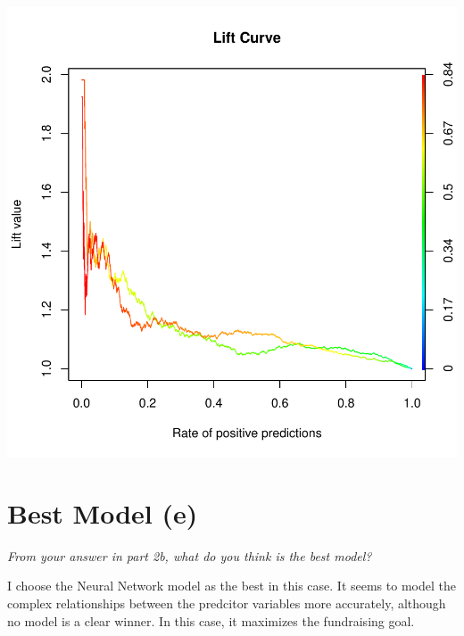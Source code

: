 \documentclass{article}
\begin{document}
\begin{Schunk}
\end{Schunk}
\includegraphics{DirectMailPrediction-026}

\section*{Best Model (e)}
{\it
From your answer in part 2b, what do you think is the best model?}

\noindent
\newline
I choose the Neural Network model as the best in this case. It seems to model the complex relationships between the predcitor variables more accurately, although no model is a clear winner. In this case, it maximizes the fundraising goal. 
\end{document}

